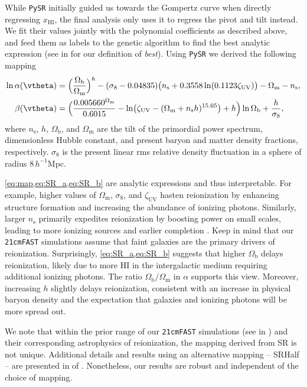 \documentclass[12pt, a4paper]{article}
\newcommand{\ns}{n_\mathrm{s}}
\newcommand{\Omegam}{\Omega_\mathrm{m}}
\newcommand{\Omegab}{\Omega_\mathrm{b}}
\newcommand{\zetaUV}{\zeta_\mathrm{UV}}
\newcommand{\HI}{\mathrm{HI}}
\newcommand{\ap}{\alpha}
\begin{document}
While \texttt{PySR} initially guided us towards the Gompertz curve when
directly regressing $x_\HI$, the final analysis only uses it to regress
the pivot and tilt instead.
We fit their values jointly with the polynomial coefficients as
described above, and feed them as labels to the genetic algorithm to
find the best analytic expression (see  in
 for our definition of \emph{best}).
Using \texttt{PySR} we derived the following mapping
%
\begin{align}
\label{eq:SR_a}
\ln\ap(\vtheta) &= \Bigl(\frac{\Omegab}{\Omegam}\Bigr)^h
  - (\sigma_8 - 0.04835) \bigl(\ns + 0.3558 \ln(0.1123 \zetaUV)\bigr)
  - \Omegam - \ns, \\
%
\label{eq:SR_b}
\beta(\vtheta) &= \Bigl( \frac{0.005660^{\Omegam}}{0.6015}
    - \ln\bigl(\zetaUV - (\Omegam + \ns h)^{15.05}\bigr) + h \Bigr)
  \ln{\Omegab} + \frac{h}{\sigma_8},
\end{align}
where $\ns$, $h$, $\Omegab$, and $\Omegam$ are the tilt of the
primordial power spectrum, dimensionless Hubble constant, and present
baryon and matter density fractions, respectively.
$\sigma_8$ is the present linear rms relative density fluctuation in a
sphere of radius $8 \, h^{-1}$Mpc.

\cref{eq:map,eq:SR_a,eq:SR_b} are analytic expressions and thus
interpretable.
For example, higher values of $\Omegam$, $\sigma_8$, and $\zetaUV$
hasten reionization by enhancing structure formation and increasing the
abundance of ionizing photons.
Similarly, larger $\ns$ primarily expedites reionization by boosting
power on small scales, leading to more ionizing sources and earlier
completion \cite{Montero2021}.
Keep in mind that our \texttt{21cmFAST} simulations assume that faint
galaxies are the primary drivers of reionization.
Surprisingly, \cref{eq:SR_a,eq:SR_b} suggests that higher $\Omegab$
delays reionization, likely due to more HI in the intergalactic medium
requiring additional ionizing photons.
The ratio $\Omegab/\Omegam$ in $\alpha$ supports this view.
Moreover, increasing $h$ slightly delays reionization, consistent with
an increase in physical baryon density and
the expectation that galaxies and ionizing photons will be more spread
out.

We note that within the prior range of our \texttt{21cmFAST} simulations
(see  in ) and their
corresponding astrophysics of reionization, the mapping derived from SR
is not unique.
Additional details and results using an alternative mapping -- SRHalf --
are presented in  of .
Nonetheless, our results are robust and independent of the choice of
mapping.
\end{document}
